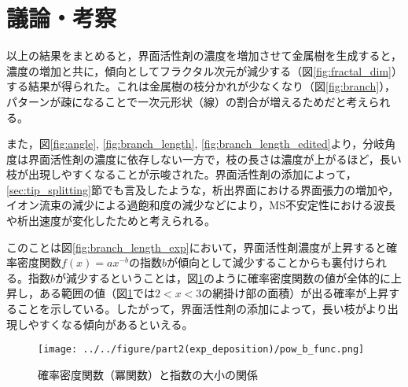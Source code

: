 \documentclass[autodetect-engine,dvi=dvipdfmx,a4paper,ja=standard,oneside,openany,11pt]{bxjsbook}
\begin{document}
\section{議論・考察}
以上の結果をまとめると，界面活性剤の濃度を増加させて金属樹を生成すると，濃度の増加と共に，傾向としてフラクタル次元が減少する（図\ref{fig:fractal_dim}）する結果が得られた。これは金属樹の枝分かれが少なくなり（図\ref{fig:branch}），パターンが疎になることで一次元形状（線）の割合が増えるためだと考えられる。

また，図\ref{fig:angle}, \ref{fig:branch_length}, \ref{fig:branch_length_edited}より，分岐角度は界面活性剤の濃度に依存しない一方で，枝の長さは濃度が上がるほど，長い枝が出現しやすくなることが示唆された。界面活性剤の添加によって，\ref{sec:tip_splitting}節でも言及したような，析出界面における界面張力の増加や，イオン流束の減少による過飽和度の減少などにより，MS不安定性における波長や析出速度が変化したためと考えられる。

このことは図\ref{fig:branch_length_exp}において，界面活性剤濃度が上昇すると確率密度関数$f(x)=ax^{-b}$の指数$b$が傾向として減少することからも裏付けられる。指数$b$が減少するということは，図\ref{fig:pow_b_func}のように確率密度関数の値が全体的に上昇し，ある範囲の値（図\ref{fig:pow_b_func}では$2<x<3$の網掛け部の面積）が出る確率が上昇することを示している。したがって，界面活性剤の添加によって，長い枝がより出現しやすくなる傾向があるといえる。

\begin{figure}[htbp]
  \centering
  \texttt{[image: ../../figure/part2(exp\_deposition)/pow\_b\_func.png]}
  \caption{確率密度関数（冪関数）と指数の大小の関係}
  \label{fig:pow_b_func}
\end{figure}

\ifdraft{
  
  
}{}
\end{document}
